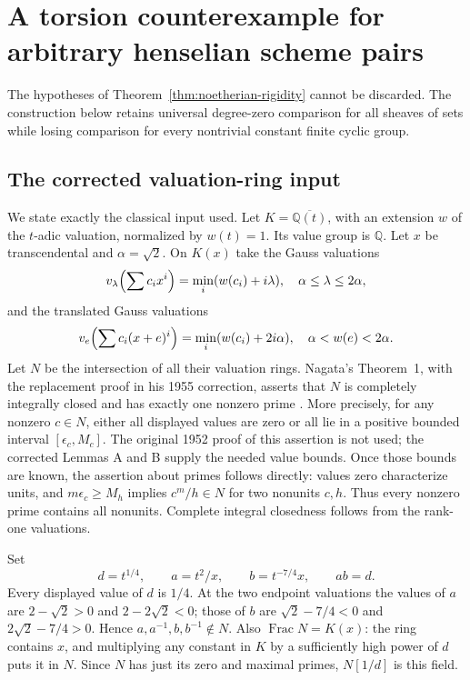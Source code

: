 \documentclass[11pt,a4paper]{article}
\theoremstyle{definition}
\newcommand{\Q}{\mathbb Q}
\begin{document}
\section{A torsion counterexample for arbitrary henselian scheme pairs}\label{sec:torsion-counterexample}
The hypotheses of Theorem~\ref{thm:noetherian-rigidity} cannot be discarded. The construction below retains universal degree-zero comparison for all sheaves of sets while losing comparison for every nontrivial constant finite cyclic group.

\subsection{The corrected valuation-ring input}
We state exactly the classical input used. Let $K=\overline{\Q(t)}$, with an extension $w$ of the $t$-adic valuation, normalized by $w(t)=1$. Its value group is $\Q$. Let $x$ be transcendental and $\alpha=\sqrt2$. On $K(x)$ take the Gauss valuations
\[
 v_\lambda\Bigl(\sum c_i x^i\Bigr)=\min_i(w(c_i)+i\lambda),
 \quad\alpha\le\lambda\le2\alpha,
\]
and the translated Gauss valuations
\[
 v_e\Bigl(\sum c_i(x+e)^i\Bigr)=\min_i(w(c_i)+2i\alpha),
 \quad\alpha<w(e)<2\alpha.
\]
Let $N$ be the intersection of all their valuation rings. Nagata's Theorem~1, with the replacement proof in his 1955 correction, asserts that $N$ is completely integrally closed and has exactly one nonzero prime \cite[pp.~29--31]{Nagata1952}\cite[pp.~209--212]{Nagata1955}. More precisely, for any nonzero $c\in N$, either all displayed values are zero or all lie in a positive bounded interval $[\epsilon_c,M_c]$. The original 1952 proof of this assertion is not used; the corrected Lemmas A and B supply the needed value bounds. Once those bounds are known, the assertion about primes follows directly: values zero characterize units, and $m\epsilon_c\ge M_h$ implies $c^m/h\in N$ for two nonunits $c,h$. Thus every nonzero prime contains all nonunits. Complete integral closedness follows from the rank-one valuations.

Set
\[
 d=t^{1/4},\qquad a=t^2/x,\qquad b=t^{-7/4}x,
 \qquad ab=d.
\]
Every displayed value of $d$ is $1/4$. At the two endpoint valuations the values of $a$ are $2-\sqrt2>0$ and $2-2\sqrt2<0$; those of $b$ are $\sqrt2-7/4<0$ and $2\sqrt2-7/4>0$. Hence $a,a^{-1},b,b^{-1}\notin N$. Also $\operatorname{Frac}N=K(x)$: the ring contains $x$, and multiplying any constant in $K$ by a sufficiently high power of $d$ puts it in $N$. Since $N$ has just its zero and maximal primes, $N[1/d]$ is this field.
\end{document}
